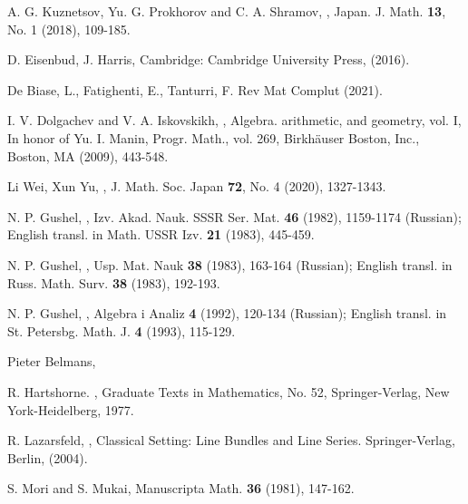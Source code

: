 \documentclass[11pt]{amsart}
\theoremstyle{plain}
\theoremstyle{definition}
\theoremstyle{expl}
\begin{document}
\begin{thebibliography}{26}
A. G. Kuznetsov, Yu. G. Prokhorov and C. A. Shramov,
,
\newblock Japan. J. Math. \textbf{13}, No. 1 (2018), 109-185.

D. Eisenbud, J. Harris,
\newblock Cambridge: Cambridge University Press, (2016).

De Biase, L., Fatighenti, E., Tanturri, F.
\newblock Rev Mat Complut (2021).

I. V. Dolgachev and V. A. Iskovskikh, 
,
\newblock Algebra. arithmetic, and geometry, vol. I, In honor of Yu. I. Manin, Progr. Math., vol. 269, Birkh\"{a}user Boston, Inc., Boston, MA (2009), 443-548.

Li Wei, Xun Yu,
,
\newblock J. Math. Soc. Japan \textbf{72}, No. 4 (2020), 1327-1343.

N. P. Gushel,
,
\newblock Izv. Akad. Nauk. SSSR Ser. Mat. \textbf{46} (1982), 1159-1174 (Russian); English transl. in Math. USSR  Izv. \textbf{21} (1983), 445-459.

N. P. Gushel,
,
\newblock Usp. Mat. Nauk \textbf{38} (1983), 163-164 (Russian); English transl. in Russ. Math. Surv. \textbf{38} (1983), 192-193. 

N. P. Gushel,
,
\newblock Algebra i Analiz \textbf{4} (1992), 120-134 (Russian); English transl. in St. Petersbg. Math. J. \textbf{4} (1993), 115-129. 

Pieter Belmans,

R. Hartshorne.
,
\newblock Graduate Texts in Mathematics, No. 52, Springer-Verlag, New York-Heidelberg, 1977.

R. Lazarsfeld,
,
\newblock Classical Setting: Line Bundles and Line Series. Springer-Verlag, Berlin, (2004). 

S. Mori and S. Mukai,
\newblock Manuscripta Math. \textbf{36} (1981), 147-162.


\end{thebibliography}
\end{document}
